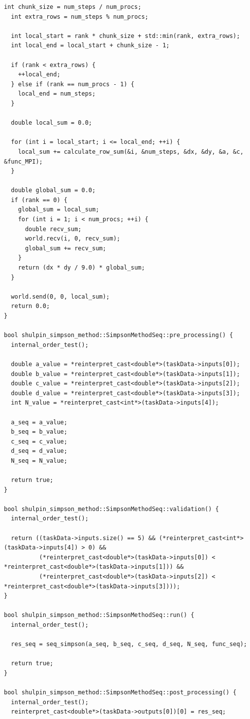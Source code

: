 \documentclass[12pt,a4paper]{article}
\begin{document}
\begin{lstlisting}[caption={simpson\_method.cpp}]
  int chunk_size = num_steps / num_procs;
  int extra_rows = num_steps % num_procs;

  int local_start = rank * chunk_size + std::min(rank, extra_rows);
  int local_end = local_start + chunk_size - 1;

  if (rank < extra_rows) {
    ++local_end;
  } else if (rank == num_procs - 1) {
    local_end = num_steps;
  }

  double local_sum = 0.0;

  for (int i = local_start; i <= local_end; ++i) {
    local_sum += calculate_row_sum(&i, &num_steps, &dx, &dy, &a, &c, &func_MPI);
  }

  double global_sum = 0.0;
  if (rank == 0) {
    global_sum = local_sum;
    for (int i = 1; i < num_procs; ++i) {
      double recv_sum;
      world.recv(i, 0, recv_sum);
      global_sum += recv_sum;
    }
    return (dx * dy / 9.0) * global_sum;
  }

  world.send(0, 0, local_sum);
  return 0.0;
}

bool shulpin_simpson_method::SimpsonMethodSeq::pre_processing() {
  internal_order_test();

  double a_value = *reinterpret_cast<double*>(taskData->inputs[0]);
  double b_value = *reinterpret_cast<double*>(taskData->inputs[1]);
  double c_value = *reinterpret_cast<double*>(taskData->inputs[2]);
  double d_value = *reinterpret_cast<double*>(taskData->inputs[3]);
  int N_value = *reinterpret_cast<int*>(taskData->inputs[4]);

  a_seq = a_value;
  b_seq = b_value;
  c_seq = c_value;
  d_seq = d_value;
  N_seq = N_value;

  return true;
}

bool shulpin_simpson_method::SimpsonMethodSeq::validation() {
  internal_order_test();

  return ((taskData->inputs.size() == 5) && (*reinterpret_cast<int*>(taskData->inputs[4]) > 0) &&
          (*reinterpret_cast<double*>(taskData->inputs[0]) < *reinterpret_cast<double*>(taskData->inputs[1])) &&
          (*reinterpret_cast<double*>(taskData->inputs[2]) < *reinterpret_cast<double*>(taskData->inputs[3])));
}

bool shulpin_simpson_method::SimpsonMethodSeq::run() {
  internal_order_test();

  res_seq = seq_simpson(a_seq, b_seq, c_seq, d_seq, N_seq, func_seq);

  return true;
}

bool shulpin_simpson_method::SimpsonMethodSeq::post_processing() {
  internal_order_test();
  reinterpret_cast<double*>(taskData->outputs[0])[0] = res_seq;


\end{lstlisting}
\end{document}
